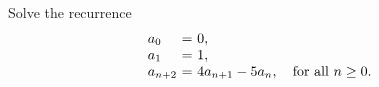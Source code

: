 \begin{ex}
  Solve the recurrence
    \begin{equation*}
    \begin{array}{l@{~}c@{~}l}
      a_0 &=& 0, \\
      a_1 &=& 1, \\
      a_{n+2} &=& 4a_{n+1} - 5a_n, \quad\mbox{for all $n\geq 0$.} \\
    \end{array}
  \end{equation*}
\end{ex}
